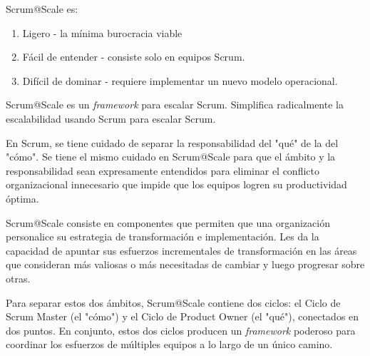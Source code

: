 \documentclass{article} %
\begin{document}
\noindent 

\noindent Scrum@Scale es:

\begin{enumerate}
\item  Ligero - la m\'{i}nima burocracia viable

\item  F\'{a}cil de entender - consiste solo en equipos Scrum.

\item  Dif\'{i}cil de dominar - requiere implementar un nuevo modelo operacional.
\end{enumerate}

\noindent 

\noindent Scrum@Scale es un \textit{framework }para escalar Scrum. Simplifica radicalmente la escalabilidad usando Scrum para escalar Scrum. 

\noindent 

\noindent En Scrum, se tiene cuidado de separar la responsabilidad del "qu\'{e}" de la del "c\'{o}mo".  Se tiene el mismo cuidado en Scrum@Scale para que el \'{a}mbito y la responsabilidad sean expresamente entendidos para eliminar el conflicto organizacional innecesario que impide que los equipos logren su productividad \'{o}ptima.

\noindent 

\noindent Scrum@Scale consiste en componentes que permiten que una organizaci\'{o}n personalice su estrategia de transformaci\'{o}n e implementaci\'{o}n. Les da la capacidad de apuntar sus esfuerzos incrementales de transformaci\'{o}n en las \'{a}reas que consideran m\'{a}s valiosas o m\'{a}s necesitadas de cambiar y luego progresar sobre otras.

\noindent 

\noindent Para separar estos dos \'{a}mbitos, Scrum@Scale contiene dos ciclos: el Ciclo de Scrum Master (el "c\'{o}mo") y el Ciclo de Product Owner (el "qu\'{e}"), conectados en dos puntos. En conjunto, estos dos ciclos producen un \textit{framework }poderoso para coordinar los esfuerzos de m\'{u}ltiples equipos a lo largo de un \'{u}nico camino.\textbf{\underbar{}}

\noindent \textbf{\underbar{}}

\noindent 
\subsection{}

\noindent 
\subsection{}
\end{document}
